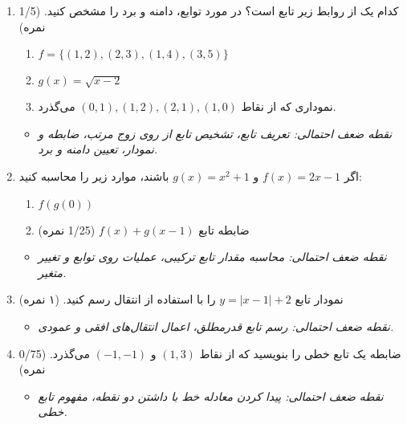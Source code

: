 \documentclass[12pt,a4paper]{article}
\begin{document}
\begin{enumerate}[label=\arabic*., start=11, rightmargin=1em, itemsep=1em]
    \item کدام یک از روابط زیر تابع است؟ در مورد توابع، دامنه و برد را مشخص کنید. (1/5 نمره)
    \begin{enumerate}[label=\abjad*)]
        \item $f = \{(1,2), (2,3), (1,4), (3,5)\}$
        \item $g(x) = \sqrt{x-2}$
        \item نموداری که از نقاط $(0,1), (1,2), (2,1), (1,0)$ می‌گذرد.
    \end{enumerate}
    \begin{itemize}[label=$\circ$, rightmargin=2em]
        \item \textit{نقطه ضعف احتمالی: تعریف تابع، تشخیص تابع از روی زوج مرتب، ضابطه و نمودار، تعیین دامنه و برد.}
    \end{itemize}

    \item اگر $f(x) = 2x-1$ و $g(x) = x^2 + 1$ باشند، موارد زیر را محاسبه کنید:
    \begin{enumerate}[label=\abjad*), itemsep=0.5em]
        \item $f(g(0))$
        \item ضابطه تابع $f(x) + g(x-1)$ (1/25 نمره)
    \end{enumerate}
    \begin{itemize}[label=$\circ$, rightmargin=2em]
        \item \textit{نقطه ضعف احتمالی: محاسبه مقدار تابع ترکیبی، عملیات روی توابع و تغییر متغیر.}
    \end{itemize}

    \item نمودار تابع $y = |x-1| + 2$ را با استفاده از انتقال رسم کنید. (۱ نمره)
    \begin{itemize}[label=$\circ$, rightmargin=2em]
        \item \textit{نقطه ضعف احتمالی: رسم تابع قدرمطلق، اعمال انتقال‌های افقی و عمودی.}
    \end{itemize}

    \item ضابطه یک تابع خطی را بنویسید که از نقاط $(1,3)$ و $(-1, -1)$ می‌گذرد. (0/75 نمره)
    \begin{itemize}[label=$\circ$, rightmargin=2em]
        \item \textit{نقطه ضعف احتمالی: پیدا کردن معادله خط با داشتن دو نقطه، مفهوم تابع خطی.}
    \end{itemize}
\end{enumerate}
\end{document}
